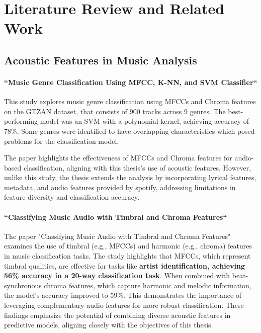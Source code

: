 \chapter{Literature Review and Related Work}
\label{cha:literaturereview}


\section{Acoustic Features in Music Analysis}
\label{sec:acousticfeaturesinmusicanalysis}

\subsubsection*{``Music Genre Classification Using MFCC, K-NN, and SVM
Classifier``} \cite{music_genre_classification_mfcc}

This study explores music genre classification using MFCCs and Chroma features
on the GTZAN dataset, that consists of 900 tracks across 9 genres. The
best-performing model was an SVM with a polynomial kernel, achieving accuracy
of 78\%. Some genres were identified to have overlapping characteristics which
posed problems for the classification model.

The paper highlights the effectiveness of MFCCs and Chroma features for
audio-based classification, aligning with this thesis's use of acoustic
features. However, unlike this study, the thesis extends the analysis by
incorporating lyrical features, metadata, and audio features provided by
spotify, addressing limitations in feature diversity and classification
accuracy.


\subsubsection*{``Classifying Music Audio with Timbral and Chroma Features``}
\cite{classifying_music_audio}
The paper "Classifying Music Audio with Timbral and Chroma Features" examines
the use of timbral (e.g., MFCCs) and harmonic (e.g., chroma) features in music
classification tasks. The study highlights that MFCCs, which represent timbral
qualities, are effective for tasks like \textbf{artist identification, achieving 56\%
accuracy in a 20-way classification task}. When combined with beat-synchronous
chroma features, which capture harmonic and melodic information, the model's
accuracy improved to 59\%. This demonstrates the importance of leveraging
complementary audio features for more robust classification. These findings
emphasize the potential of combining diverse acoustic features in predictive
models, aligning closely with the objectives of this thesis.



